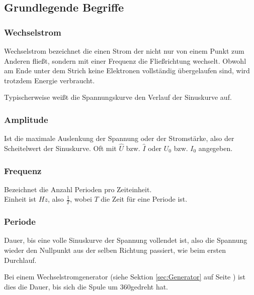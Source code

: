 


\subsection{Grundlegende Begriffe}		\label{subsec:ErlaeuterungenGrundlegend}


\subsubsection{Wechselstrom}

Wechselstrom bezeichnet die einen Strom der nicht nur von einem Punkt zum Anderen fließt, sondern mit einer Frequenz die Fließrichtung wechselt. Obwohl am Ende unter dem Strich keine Elektronen vollständig \glqq übergelaufen\grqq{} sind, wird trotzdem Energie verbraucht.

Typischerweise weißt die Spannungskurve den Verlauf der Sinuskurve auf.


\subsubsection{Amplitude}

Ist die maximale Auslenkung der Spannung oder der Stromstärke, also der Scheitelwert der Sinuskurve. Oft mit $\hat{U}$ bzw. $\hat{I}$ oder $U_{0}$ bzw. $I_{0}$ angegeben.


\subsubsection{Frequenz}

Bezeichnet die Anzahl Perioden pro Zeiteinheit. \\ Einheit ist $Hz$, also $\frac{1}{T}$, wobei $T$ die Zeit für eine Periode ist.


\subsubsection{Periode}

Dauer, bis eine volle Sinuskurve der Spannung vollendet ist, also die Spannung wieder den Nullpunkt aus der selben Richtung passiert, wie beim ersten Durchlauf.

Bei einem Wechselstromgenerator (siehe Sektion \ref{sec:Generator} auf Seite \pageref{sec:Generator}) ist dies die Dauer, bis sich die Spule um 360\degree gedreht hat.


